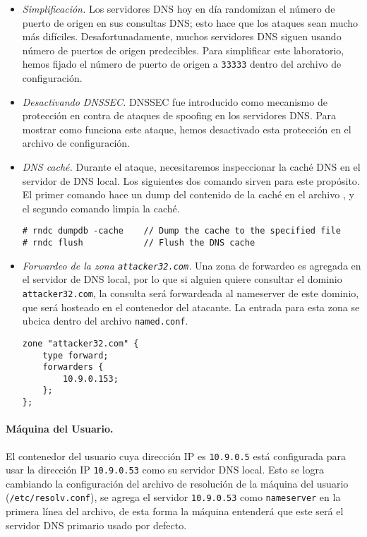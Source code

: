 \begin{itemize}
\item \textit{Simplificación.}
Los servidores DNS hoy en día randomizan el número de puerto de origen en sus consultas DNS; esto hace que los ataques sean mucho más difíciles. Desafortunadamente, muchos servidores DNS siguen usando número de puertos de origen predecibles. Para simplificar este laboratorio, hemos fijado el número de puerto de origen a {\tt 33333} dentro del archivo de configuración.

\item \textit{Desactivando DNSSEC.} 
DNSSEC fue introducido como mecanismo de protección en contra de ataques de spoofing en los servidores DNS. Para mostrar como funciona este ataque, hemos desactivado esta protección en el archivo de configuración.

\item \textit{DNS caché.}
Durante el ataque, necesitaremos inspeccionar la caché DNS en el servidor de DNS local. Los siguientes dos comando sirven para este propósito.
El primer comando hace un dump del contenido de la caché en el archivo , y el segundo comando limpia la caché.

\begin{lstlisting}
# rndc dumpdb -cache    // Dump the cache to the specified file
# rndc flush            // Flush the DNS cache
\end{lstlisting}

\item \textit{Forwardeo de la zona \texttt{attacker32.com}.}
Una zona de forwardeo es agregada en el servidor de DNS local, por lo que si alguien quiere consultar el dominio \texttt{attacker32.com}, la consulta será forwardeada al nameserver de este dominio, que será hosteado en el contenedor del atacante. La entrada para esta zona se ubcica dentro del archivo \texttt{named.conf}.

\begin{lstlisting}
zone "attacker32.com" {
    type forward;
    forwarders { 
        10.9.0.153; 
    };
};
\end{lstlisting}
\end{itemize}



\paragraph{Máquina del Usuario.}
El contenedor del usuario cuya dirección IP es {\tt 10.9.0.5} está configurada para usar la dirección IP {\tt 10.9.0.53} como su servidor DNS local.
Esto se logra cambiando la configuración del archivo de resolución de la máquina del usuario (\texttt{/etc/resolv.conf}), se agrega el servidor \texttt{10.9.0.53}  como \texttt{nameserver} en la primera línea del archivo, de esta forma la máquina entenderá que este será el servidor DNS primario usado por defecto.


